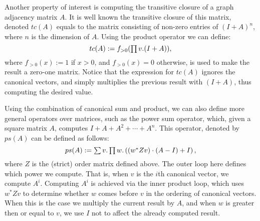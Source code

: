 Another property of interest is computing the transitive closure of a graph adjacency matrix $A$. It is well known the transitive closure of this matrix, denoted $tc(A)$ equals to the matrix consisting of non-zero entries of $(I + A)^n$, where $n$ is the dimension of $A$. Using the product operator we can define:
$$tc(A) := f_{>0}(\textstyle\prod v. (I + A)),$$
where $f_{>0}(x) := 1$ if $x>0$, and $f_{>0}(x) = 0$ otherwise, is used to make the result a zero-one matrix. Notice that the expression for $tc(A)$ ignores the canonical vectors, and simply multiplies the previous result with $(I + A)$, thus computing the desired value.

Using the combination of canonical sum and product, we can also define more general operators over matrices, such as the power sum operator, which, given a square matrix $A$, computes $I + A + A^2 + \cdots + A^n$. This operator, denoted by $ps(A)$ can be defined as follows:
$$ps(A) := \textstyle\sum v.\textstyle\prod w. \left( (w^*Zv)\cdot (A-I) + I\right),$$
where $Z$ is the (strict) order matrix defined above. The outer loop here defines which power we compute. That is, when $v$ is the $i$th canonical vector, we compute $A^i$. Computing $A^i$ is achieved via the inner product loop, which uses $w^*Zv$ to determine whether $w$ comes before $v$ in the ordering of canonical vectors. When this is the case we multiply the current result by $A$, and when $w$ is greater then or equal to $v$, we use $I$ not to affect the already computed result.
